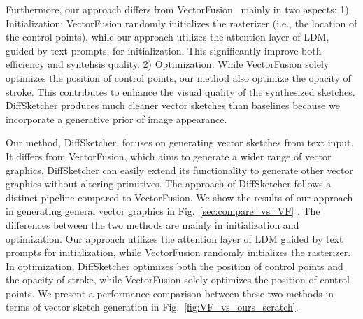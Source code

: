 Furthermore, our approach differs from VectorFusion~\cite{jain2022vectorfusion} mainly in two aspects: 1) Initialization: VectorFusion randomly initializes the rasterizer (i.e., the location of the control points), while our approach utilizes the attention layer of LDM, guided by text prompts, for initialization. This significantly improve both efficiency and syntehsis quality. 2) Optimization: While VectorFusion solely optimizes the position of control points, our method also optimize the opacity of stroke. This contributes to enhance the visual quality of the synthesized sketches.
DiffSketcher produces much cleaner vector sketches than baselines because we incorporate a generative prior of image appearance.

Our method, DiffSketcher, focuses on generating vector sketches from text input. It differs from VectorFusion, which aims to generate a wider range of vector graphics. DiffSketcher can easily extend its functionality to generate other vector graphics without altering primitives. The approach of DiffSketcher follows a distinct pipeline compared to VectorFusion. We show the results of our approach in generating general vector graphics in Fig.~\ref{sec:compare_vs_VF} . The differences between the two methods are mainly in initialization and optimization. Our approach utilizes the attention layer of LDM guided by text prompts for initialization, while VectorFusion randomly initializes the rasterizer. In optimization, DiffSketcher optimizes both the position of control points and the opacity of stroke, while VectorFusion solely optimizes the position of control points. We present a performance comparison between these two methods in terms of vector sketch generation in Fig.~\ref{fig:VF_vs_ours_scratch}.
